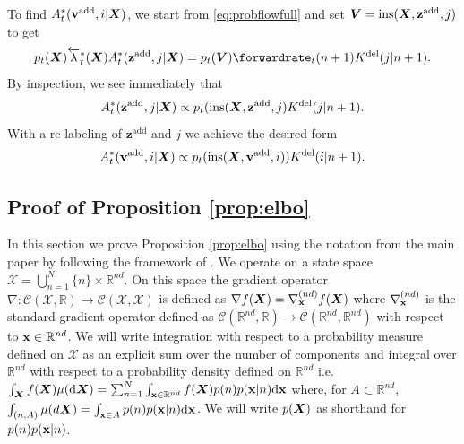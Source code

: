 \newcommand{\zadd}{\mathbf{z}^{\text{add}}}
To find $A_t^*({\mathbf{v}}^{\textup{add}}, i | {\bm{X}})$, we start from \eqref{eq:probflowfull} and set $\mV = \text{ins}(\mX, \zadd, j)$ to get
\begin{equation}
    p_t(\mX) \backwardrate_t^*(\mX) \autonet_t^*(\zadd, j | \mX) = p_t(\mV) \forwardrate_t(n+1) \delidxdist(j | n+1) .
\end{equation}
By inspection, we see immediately that
\begin{equation}
    \autonet_t^*(\zadd, j | \mX) \propto p_t(\text{ins}(\mX, \zadd, j) \delidxdist(j | n+1) . 
\end{equation}
With a re-labeling of $\zadd$ and $j$ we achieve the desired form
\begin{equation}
    A_t^*({\mathbf{v}}^{\textup{add}}, i | {\bm{X}}) \propto p_t(\text{ins}({\bm{X}}, {\mathbf{v}}^{\textup{add}}, i)) K^{\textup{del}}(i | n+1) .
\end{equation}

\subsection{Proof of Proposition \ref{prop:elbo}}
\label{sec:tddm-proof_elbo}

\newcommand{\adjointK}{\hat{\mathcal{K}}^*}
\newcommand{\K}{\hat{\mathcal{K}}}
\newcommand{\mrate}{\lambda^M}
\newcommand{\mdrift}{\mathbf{b}^M}
\newcommand{\inty}{\sum_{m=1}^N \int_{\y \in \mathbb{R}^{md}}}
\newcommand{\intyNont}{\sum_{m=1 \backslash n_t}^N \int_{\y \in \mathbb{R}^{md}}}
\newcommand{\intx}{\sum_{n=1}^N \int_{\rvx \in \mathbb{R}^{nd}}}
\newcommand{\mtk}{K^{M}}
\newcommand{\Ldiff}{ \hat{\mathcal{L}}^{\text{diff}}  }
\newcommand{\LJ}{\hat{\mathcal{L}}^{\text{J}} }
\newcommand{\aLJ}{\hat{\mathcal{L}}^{\text{J}*  } }

In this section we prove Proposition \ref{prop:elbo} using the notation from the main paper by following the framework of \citet{benton2022denoising}.  We operate on a state
space $\mathcal{X} = \bigcup_{n=1}^N \{n\} \times \mathbb{R}^{nd}$.  On this
space the gradient operator
$\nabla: \mathcal{C}(\mathcal{X}, \mathbb{R}) \rightarrow
\mathcal{C}(\mathcal{X}, \mathcal{X})$ is defined as
$\nabla f({\bm{X}}) = \nabla^{(nd)}_{{\mathbf{x}}} f({\bm{X}})$ where $\nabla^{(nd)}_{{\mathbf{x}}}$ is the
standard gradient operator defined as
$\mathcal{C}(\mathbb{R}^{nd}, \mathbb{R}) \rightarrow
\mathcal{C}(\mathbb{R}^{nd}, \mathbb{R}^{nd})$ with respect to
${\mathbf{x}} \in \mathbb{R}^{nd}$. We will write integration with respect to a
probability measure defined on $\mathcal{X}$ as an explicit sum over the number
of components and integral over $\mathbb{R}^{nd}$ with respect to a probability
density defined on $\mathbb{R}^{nd}$ i.e.
$\int_{{\bm{X}}} f({\bm{X}}) \mu(\mathrm{d} {\bm{X}}) = \sum_{n=1}^N \int_{{\mathbf{x}} \in \mathbb{R}^{nd}} f({\bm{X}})
p(n)p({\mathbf{x}} | n) \mathrm{d} {\mathbf{x}} $ where, for $A \subset \mathbb{R}^{nd}$,
$\int_{(n, A)} \mu(d{\bm{X}}) = \int_{{\mathbf{x}} \in A} p(n)p({\mathbf{x}} | n) \mathrm{d} {\mathbf{x}}$. We will write
$p({\bm{X}})$ as shorthand for $p(n)p({\mathbf{x}} | n)$.

